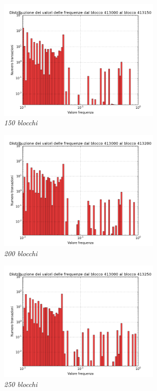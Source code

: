 \begin{figure}[htbp]
	\centering
	\includegraphics[width=0.7\textwidth]{figure/hist150b}
	\caption{\textit{150 blocchi}\label{fig:hist150b}}
\end{figure}

\begin{figure}[htbp]
	\centering
	\includegraphics[width=0.7\textwidth]{figure/hist200b}
	\caption{\textit{200 blocchi}\label{fig:hist200b}}
\end{figure}

\begin{figure}[htbp]
	\centering
	\includegraphics[width=0.7\textwidth]{figure/hist250b}
	\caption{\textit{250 blocchi}\label{fig:hist250b}}
\end{figure}

